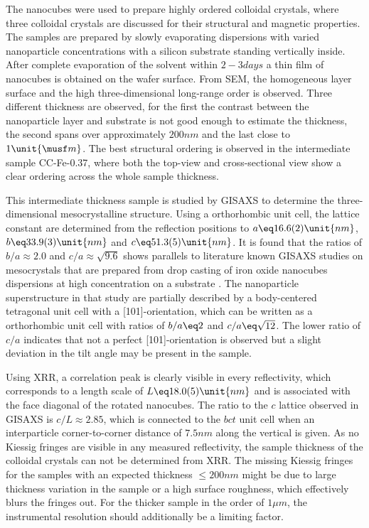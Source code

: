 \documentclass[\main/dresen_thesis.tex]{subfiles}
\begin{document}
  The nanocubes were used to prepare highly ordered colloidal crystals, where three colloidal crystals are discussed for their structural and magnetic properties.
  The samples are prepared by slowly evaporating dispersions with varied nanoparticle concentrations with a silicon substrate standing vertically inside.
  After complete evaporation of the solvent within $2 - 3 \unit{days}$ a thin film of nanocubes is obtained on the wafer surface.
  From SEM, the homogeneous layer surface and the high three-dimensional long-range order is observed.
  Three different thickness are observed, for the first the contrast between the nanoparticle layer and substrate is not good enough to estimate the thickness, the second spans over approximately $200 \unit{nm}$ and the last close to $1 \unit{\musf m}$.
  The best structural ordering is observed in the intermediate sample CC-Fe-0.37, where both the top-view and cross-sectional view show a clear ordering across the whole sample thickness.

  This intermediate thickness sample is studied by GISAXS to determine the three-dimensional mesocrystalline structure.
  Using a orthorhombic unit cell, the lattice constant are determined from the reflection positions to $a \eq 16.6(2) \unit{nm}$, $b\eq 33.9(3) \unit{nm}$ and $c\eq 51.3(5) \unit{nm}$.
  It is found that the ratios of $b/a \approx 2.0$ and $c/a \approx \sqrt{9.6}$ shows parallels to literature known GISAXS studies on mesocrystals that are prepared from drop casting of iron oxide nanocubes dispersions at high concentration on a substrate \cite{Wetterskog_2016_Tunin}.
  The nanoparticle superstructure in that study are partially described by a body-centered tetragonal unit cell with a [101]-orientation, which can be written as a orthorhombic unit cell with ratios of $b/a \eq 2$ and $c/a \eq \sqrt{12}$.
  The lower ratio of $c/a$ indicates that not a perfect [101]-orientation is observed but a slight deviation in the tilt angle may be present in the sample.

  Using XRR, a correlation peak is clearly visible in every reflectivity, which corresponds to a length scale of $L \eq 18.0(5) \unit{nm}$ and is associated with the face diagonal of the rotated nanocubes.
  The ratio to the $c$ lattice observed in GISAXS is $c/L \approx 2.85$, which is connected to the $bct$ unit cell when an interparticle corner-to-corner distance of $7.5 \unit{nm}$ along the vertical is given.
  As no Kiessig fringes are visible in any measured reflectivity, the sample thickness of the colloidal crystals can not be determined from XRR.
  The missing Kiessig fringes for the samples with an expected thickness $\le 200 \unit{nm}$ might be due to large thickness variation in the sample or a high surface roughness, which effectively blurs the fringes out.
  For the thicker sample in the order of $1 \unit{\mu m}$, the instrumental resolution should additionally be a limiting factor.
  \\
\end{document}
